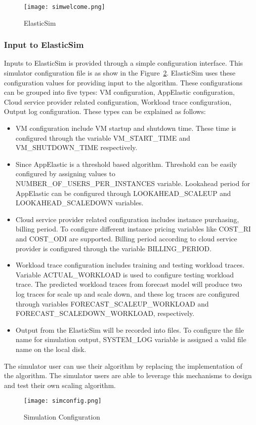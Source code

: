 \begin{figure}[h]
  \begin{center}
    \texttt{[image: simwelcome.png]}
    \caption{ElasticSim}
    \label{figure:simwelcome}
  \end{center}
\end{figure}

\subsubsection{Input to ElasticSim}
\label{subs:Input to ElasticSim}
Inputs to ElasticSim is provided through a simple configuration interface. This simulator configuration file is as show in the Figure~\ref{figure:simconfig}. ElasticSim uses these configuration values for providing input to the algorithm. These configurations can be grouped into five types: VM configuration, AppElastic configuration, Cloud service provider related configuration, Workload trace configuration, Output log configuration. These types can be explained as follows:

\begin{itemize}
  \item VM configuration include VM startup and shutdown time. These time is configured through the variable VM\_START\_TIME and VM\_SHUTDOWN\_TIME respectively.
  \item Since AppElastic is a threshold based algorithm. Threshold can be easily configured by assigning values to NUMBER\_OF\_USERS\_PER\_INSTANCES variable. Lookahead period for AppElastic can be configured through LOOKAHEAD\_SCALEUP and LOOKAHEAD\_SCALEDOWN variables.
  \item Cloud service provider related configuration includes instance purchasing, billing period. To configure different instance pricing variables like COST\_RI and COST\_ODI are supported. Billing period according to cloud service provider is configured through the variable BILLING\_PERIOD.
  \item Workload trace configuration includes training and testing workload traces. Variable ACTUAL\_WORKLOAD is used to configure testing workload trace. The predicted workload traces from forecast model will produce two log traces for scale up and scale down, and these log traces are configured through variables FORECAST\_SCALEUP\_WORKLOAD and FORECAST\_SCALEDOWN\_WORKLOAD, respectively.
  \item Output from the ElasticSim will be recorded into files. To configure the file name for simulation output, SYSTEM\_LOG variable is assigned a valid file name on the local disk.
\end{itemize}
The simulator user can use their algorithm by replacing the implementation of the algorithm. The simulator users are able to leverage this mechanisms to design and test their own scaling algorithm.
\begin{figure}[h]
  \begin{center}
    \texttt{[image: simconfig.png]}
    \caption{Simulation Configuration}
    \label{figure:simconfig}
  \end{center}
\end{figure}

